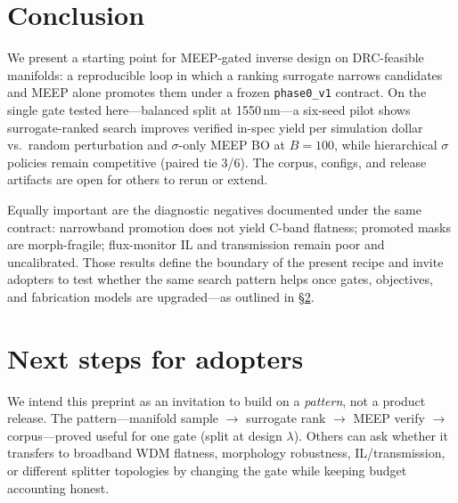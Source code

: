 \documentclass[11pt,a4paper]{article}
\begin{document}
\section{Conclusion}
\label{sec:conclusion}

We present a starting point for MEEP-gated inverse design on DRC-feasible manifolds: a reproducible loop in which a ranking surrogate narrows candidates and MEEP alone promotes them under a frozen \texttt{phase0\_v1} contract.
On the single gate tested here---balanced split at 1550\,nm---a six-seed pilot shows surrogate-ranked search improves verified in-spec yield per simulation dollar vs.\ random perturbation and $\sigma$-only MEEP BO at $B{=}100$, while hierarchical $\sigma$ policies remain competitive (paired tie 3/6).
The corpus, configs, and release artifacts are open for others to rerun or extend.

Equally important are the diagnostic negatives documented under the same contract: narrowband promotion does not yield C-band flatness; promoted masks are morph-fragile; flux-monitor IL and transmission remain poor and uncalibrated.
Those results define the boundary of the present recipe and invite adopters to test whether the same search pattern helps once gates, objectives, and fabrication models are upgraded---as outlined in \S\ref{sec:roadmap}.

\section{Next steps for adopters}
\label{sec:roadmap}

We intend this preprint as an invitation to build on a \emph{pattern}, not a product release.
The pattern---manifold sample $\to$ surrogate rank $\to$ MEEP verify $\to$ corpus---proved useful for one gate (split at design $\lambda$).
Others can ask whether it transfers to broadband WDM flatness, morphology robustness, IL/transmission, or different splitter topologies by changing the gate while keeping budget accounting honest.
\end{document}
